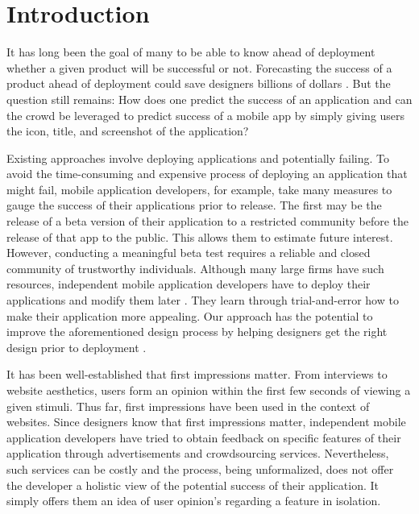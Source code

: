 \section{Introduction}

It has long been the goal of many to be able to know ahead of deployment whether a given product will be successful or not. Forecasting the success of a product ahead of deployment could save designers billions of dollars \cite{tohidi06:getting}. But the question still remains: How does one predict the success of an application and can the crowd be leveraged to predict success of a mobile app by simply giving users the icon, title, and screenshot of the application?

Existing approaches involve deploying applications and potentially failing. To avoid the time-consuming and expensive process of deploying an application that might fail, mobile application developers, for example, take many measures to gauge the success of their applications prior to release.  The first may be the release of a beta version of their application to a restricted community before the release of that app to the public.  This allows them to estimate future interest. However, conducting a meaningful beta test requires a reliable and closed community of trustworthy individuals. Although many large firms have such resources, independent mobile application developers have to deploy their applications and modify them later \cite{website06:mobile}.  They learn through trial-and-error how to make their application more appealing.  Our approach has the potential to improve the aforementioned design process by helping designers get the right design prior to deployment \cite{tohidi06:getting}.


It has been well-established that first impressions matter. From interviews to website aesthetics, users form an opinion within the first few seconds of viewing a given stimuli. Thus far, first impressions have been used in the context of websites.  Since designers know that first impressions matter, independent mobile application developers have tried to obtain feedback on specific features of their application through advertisements and crowdsourcing services. Nevertheless, such services can be costly and the process, being unformalized, does not offer the developer a holistic view of the potential success of their application.  It simply offers them an idea of user opinion's regarding a feature in isolation.

